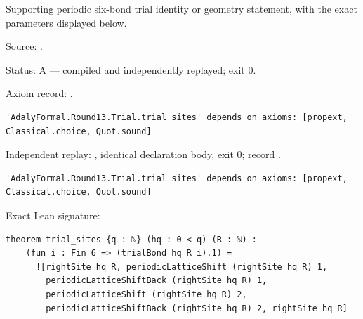 \begin{theorem}[bp-361]
\label{bp-361}
\leanok
Supporting periodic six-bond trial identity or geometry statement, with the exact parameters displayed below.

\par Source: \texttt{}.
\par Status: A — compiled and independently replayed; exit 0.
\par Axiom record: \texttt{}.
\begin{verbatim}
'AdalyFormal.Round13.Trial.trial_sites' depends on axioms: [propext, Classical.choice, Quot.sound]
\end{verbatim}
\par Independent replay: \texttt{}, identical declaration body, exit 0; record \texttt{}.
\begin{verbatim}
'AdalyFormal.Round13.Trial.trial_sites' depends on axioms: [propext, Classical.choice, Quot.sound]
\end{verbatim}
\par Exact Lean signature:
\begin{verbatim}
theorem trial_sites {q : ℕ} (hq : 0 < q) (R : ℕ) :
    (fun i : Fin 6 => (trialBond hq R i).1) =
      ![rightSite hq R, periodicLatticeShift (rightSite hq R) 1,
        periodicLatticeShiftBack (rightSite hq R) 1,
        periodicLatticeShift (rightSite hq R) 2,
        periodicLatticeShiftBack (rightSite hq R) 2, rightSite hq R]
\end{verbatim}
\end{theorem}

